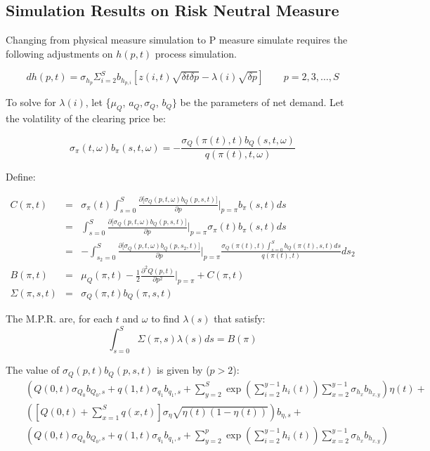 \documentclass{article}
\begin{document}
\subsection{Simulation Results on Risk Neutral Measure}
Changing from physical measure simulation to P measure simulate requires the following adjustments on $h(p,t)$ process simulation.

$$
dh(p,t) = \sigma_{h_p} \Sigma_{i=2}^{S} b_{h_{p, i}} [z(i,t) \sqrt{\delta t \delta p} - \lambda(i)\sqrt{\delta p}] \qquad p = 2, 3, \ldots, S
$$

To solve for $\lambda(i)$, let \{$\mu _{Q}$, $a_{Q},\sigma _{Q}$, $b_{Q}\}$ be the parameters of net demand.
Let the volatility of the clearing price be:

\begin{equation*}
\sigma _{\pi }(t,\omega )b_{\pi }(s,t,\omega )=-\frac{\sigma _{Q}(\pi
(t),t)b_{Q}(s,t,\omega )}{q(\pi (t),t,\omega )}
\end{equation*}
\bigskip

Define:

\begin{eqnarray*}
C(\pi ,t) &=&\sigma _{\pi }(t)\int_{s=0}^{S}\frac{\partial \lbrack \sigma_{Q}(p,t,\omega )b_{Q}(p,s,t)]}{\partial p}|_{p=\pi }b_{\pi }(s,t)ds \\
&=&\int_{s=0}^{S}\frac{\partial \lbrack \sigma _{Q}(p,t,\omega )b_{Q}(p,s,t)]}{\partial p}|_{p=\pi }\sigma _{\pi }(t)b_{\pi }(s,t)ds \\
&=&-\int_{s_{2}=0}^{S}\frac{\partial \lbrack \sigma _{Q}(p,t,\omega)b_{Q}(p,s_{2},t)]}{\partial p}|_{p=\pi }\frac{\sigma _{Q}(\pi(t),t)\int_{s=0}^{S}b_{Q}(\pi (t),s,t)ds}{q(\pi (t),t)}ds_{2} \\
B(\pi ,t) &=&\mu _{Q}(\pi ,t)-\frac{1}{2}\frac{\partial ^{2}Q(p,t)}{\partial p^{2}}|_{p=\pi }+C(\pi ,t) \\
\Sigma (\pi ,s,t) &=&\sigma _{Q}(\pi ,t)b_{Q}(\pi ,s,t)
\end{eqnarray*}
\bigskip

The M.P.R. are, for each $t$ and $\omega $ to find $\lambda (s)$ that
satisfy:%
\begin{equation*}
\int_{s=0}^{S}\Sigma (\pi ,s)\lambda (s)ds=B(\pi )
\end{equation*}

The value of $\sigma _{Q}(p,t)b_{Q}(p,s,t)$ is given by ($p > 2$):%
\begin{eqnarray*}
&&\left( Q(0,t)\sigma _{Q_{0}}b_{Q_{0},s}+q(1,t)\sigma _{q_{1}}b_{q_{1},s}+\sum_{y=2}^{S}\exp
(\sum_{i=2}^{y-1}h_{i}(t))\sum_{x=2}^{y-1}\sigma_{h_{x}}b_{h_{x,y}}\right) \eta (t)+ \\
&&\left( [Q(0,t)+\sum_{x=1}^{S}q(x,t)]\sigma _{\eta }\sqrt{\eta (t)(1-\eta
(t))}\right) b_{\eta ,s}+ \\
&&\left( Q(0,t)\sigma_{Q_{0}}b_{Q_{0},s}+q(1,t)\sigma_{q_{1}}b_{q_{1},s}+\sum_{y=2}^{p}\exp
(\sum_{i=2}^{y-1}h_{i}(t))\sum_{x=2}^{y-1}\sigma_{h_{x}}b_{h_{x,y}}\right)
\end{eqnarray*}
\end{document}
